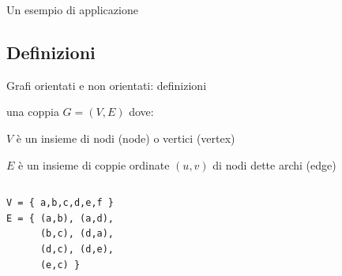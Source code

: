 \begin{frame}{Un esempio di applicazione}


\pause
\bigskip
{}

\end{frame}



\subsection{Definizioni}

\begin{frame}[fragile]{Grafi orientati e non orientati: definizioni}

\vspace{-6pt}
\begin{myboxtitle}
\EE una coppia $G=(V,E)$ dove: 
\BI
\item $V$ è un insieme di \alert{nodi} (\alert{node}) o \alert{vertici} (\alert{vertex})
\item $E$ è un insieme di coppie ordinate $(u,v)$ di nodi dette \alert{archi} (\alert{edge})
\EI
\end{myboxtitle}

\begin{columns}[T]
\begin{lstlisting}
V = { a,b,c,d,e,f }
E = { (a,b), (a,d),
      (b,c), (d,a),
      (d,c), (d,e),
      (e,c) }
\end{lstlisting}
\vspace{-9pt}
\end{columns}

\end{frame}

